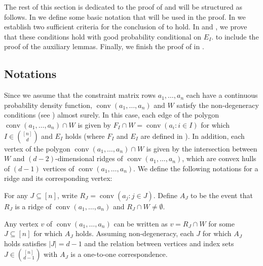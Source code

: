 \documentclass{theoretics}
\newcommand{\conv}{\operatorname{conv}}
\renewcommand{\subset}{\subseteq}
\begin{document}
The rest of this section is dedicated to the proof of  and will be structured as follows.
In  we define some basic notation that will be used in the proof.
In  we establish two sufficient criteria for the conclusion of  to hold.
In  and , we prove that these conditions hold with good probability conditional on $E_I$.
 to  include the proof of the auxiliary lemmas.
Finally, we finish the proof of  in .


\subsection{Notations}\label{sub:multi-notation}

Since we assume that the constraint matrix rows $a_1,\dots,a_n$ each have a continuous probability density function,
$\conv(a_1,\dots,a_n)$ and $W$ satisfy the non-degeneracy conditions (see ) almost surely.
In this case, each edge of the polygon $\conv(a_1, \ldots, a_n) \cap W$ is
given by $F_I \cap W = \conv(a_i: i\in I)$ for which $I \in \binom{[n]}{d}$ and $E_I$ holds
(where $F_I$ and $E_I$ are defined in ).  In addition, each vertex
of the polygon $\conv(a_1, \ldots, a_n) \cap W$ is given by the intersection
between $W$ and $(d-2)$-dimensional ridges of $\conv(a_1, \ldots, a_n)$, which
are convex hulls of $(d-1)$ vertices of $\conv(a_1, \ldots, a_n)$.
We define the following notations for a ridge and its corresponding vertex:

\begin{definition}\label{def:vertex-event}
    For any $J \subset [n]$, write $R_J = \conv(a_j : j\in J)$.
    Define $A_J$ to be the event that $R_J$ is a ridge of $\conv(a_1, \ldots, a_n)$
    and $R_J \cap W \neq \emptyset$.
\end{definition}

\begin{remark}
    Any vertex $v$ of $\conv(a_1,\dots,a_n)$ can be written as $v = R_J \cap W$
    for some $J \subset [n]$ for which $A_J$ holds.
    Assuming non-degeneracy, each $J$ for which $A_J$ holds satisfies $|J| = d-1$
    and the relation between vertices and index sets $J\in\binom{[n]}{d-1}$ with $A_J$
    is a one-to-one correspondence.
\end{remark}
\end{document}
